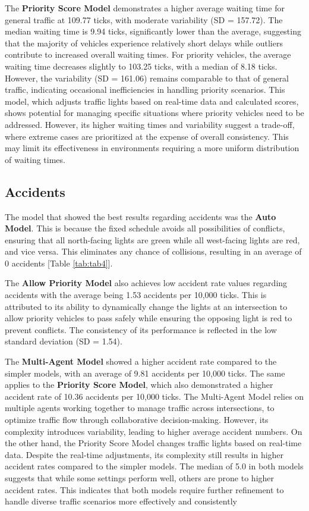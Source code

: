 \documentclass[sigconf]{acmart}
\begin{document}
The \textbf{Priority Score Model} demonstrates a higher average waiting time for general traffic at 109.77 ticks, with moderate variability (SD = 157.72). The median waiting time is 9.94 ticks, significantly lower than the average, suggesting that the majority of vehicles experience relatively short delays while outliers contribute to increased overall waiting times. For priority vehicles, the average waiting time decreases slightly to 103.25 ticks, with a median of 8.18 ticks. However, the variability (SD = 161.06) remains comparable to that of general traffic, indicating occasional inefficiencies in handling priority scenarios. This model, which adjusts traffic lights based on real-time data and calculated scores, shows potential for managing specific situations where priority vehicles need to be addressed. However, its higher waiting times and variability suggest a trade-off, where extreme cases are prioritized at the expense of overall consistency. This may limit its effectiveness in environments requiring a more uniform distribution of waiting times.

\subsection{Accidents}

The model that showed the best results regarding accidents was the \textbf{Auto Model}. This is because the fixed schedule avoids all possibilities of conflicts, ensuring that all north-facing lights are green while all west-facing lights are red, and vice versa. This eliminates any chance of collisions, resulting in an average of 0 accidents [Table \ref{tab:tab4}].

The \textbf{Allow Priority Model} also achieves low accident rate values regarding accidents with the average being 1.53 accidents per 10,000 ticks.  This is attributed to its ability to dynamically change the lights at an intersection to allow priority vehicles to pass safely while ensuring the opposing light is red to prevent conflicts. The consistency of its performance is reflected in the low standard deviation (SD =  1.54).

The \textbf{Multi-Agent Model} showed a higher accident rate compared to the simpler models, with an average of 9.81 accidents per 10,000 ticks. The same applies to the \textbf{Priority Score Model}, which also demonstrated a higher accident rate of 10.36 accidents per 10,000 ticks. The Multi-Agent Model relies on multiple agents working together to manage traffic across intersections, to optimize traffic flow through collaborative decision-making. However, its complexity introduces variability, leading to higher average accident numbers. On the other hand, the Priority Score Model changes traffic lights based on real-time data. Despite the real-time adjustments, its complexity still results in higher accident rates compared to the simpler models.
The median of 5.0 in both models suggests that while some settings perform well, others are prone to higher accident rates. This indicates that both models require further refinement to handle diverse traffic scenarios more effectively and consistently
\end{document}
